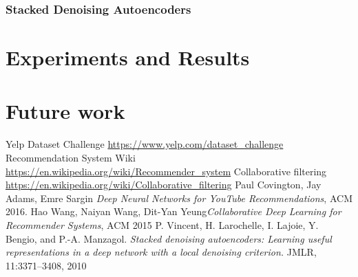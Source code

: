 \documentclass[11pt]{article}
\begin{document}
		\subsubsection{Stacked Denoising Autoencoders}
		
	
	\section{Experiments and Results}
	
	\section{Future work}
	
	
	\begin{thebibliography}{9}
		
	 Yelp Dataset Challenge \url{https://www.yelp.com/dataset_challenge}
	 Recommendation System Wiki \url{https://en.wikipedia.org/wiki/Recommender_system}
	Collaborative filtering \url{https://en.wikipedia.org/wiki/Collaborative_filtering}
	 Paul Covington, Jay Adams, Emre Sargin \textit{Deep Neural Networks for YouTube Recommendations}, ACM 2016.
	 Hao Wang, Naiyan Wang, Dit-Yan Yeung\textit{Collaborative Deep Learning for Recommender Systems}, ACM 2015
	 P. Vincent, H. Larochelle, I. Lajoie, Y. Bengio, and
	P.-A. Manzagol. \textit{Stacked denoising autoencoders:
		Learning useful representations in a deep network with
		a local denoising criterion.} JMLR, 11:3371–3408, 2010
	\end{thebibliography}
	
	
	
	
	
	
\end{document}

